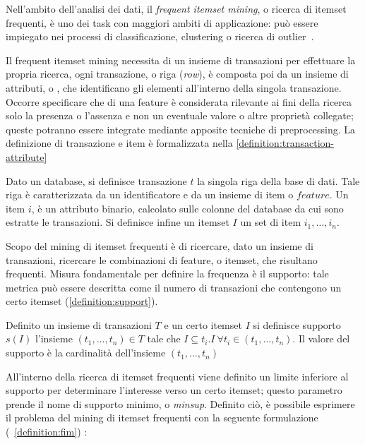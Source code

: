 Nell'ambito dell'analisi dei dati, il \textit{frequent itemset mining}, o ricerca di itemset frequenti,
è uno dei task con maggiori ambiti di applicazione: può essere impiegato nei processi di classificazione,
clustering o ricerca di outlier~\cite{article}.

Il frequent itemset mining necessita di un insieme di transazioni per effettuare la propria ricerca,
ogni transazione, o riga (\textit{row}), è composta poi da un insieme di attributi,
o , che identificano gli elementi all'interno della singola transazione.
Occorre specificare che di una feature è considerata rilevante ai fini della ricerca solo la presenza
o l'assenza e non un eventuale valore o altre proprietà collegate; queste potranno essere integrate
mediante apposite tecniche di preprocessing.
La definizione di transazione e item è formalizzata nella \cref{definition:transaction-attribute}

\begin{definition}\label{definition:transaction-attribute}
  Dato un database, si definisce transazione \(t\) la singola riga della base di dati.
  Tale riga è caratterizzata da un identificatore e da un insieme di item o \(feature\).
  Un item \(i\), è un attributo binario, calcolato sulle colonne del database da cui sono estratte le transazioni.
  Si definisce infine un itemset \(I\) un set di item \(i_1, \ldots, i_n\).
\end{definition}


Scopo del mining di itemset frequenti è di ricercare, dato un insieme di transazioni, ricercare
le combinazioni di feature, o itemset, che risultano frequenti.
Misura fondamentale per definire la frequenza è il supporto: tale metrica può essere
descritta come il numero di transazioni che contengono un certo itemset (\cref{definition:support}).

\begin{definition}[Supporto]\label{definition:support}
Definito un insieme di transazioni \(T\) e un certo itemset \(I\) si definisce supporto \(s(I)\) l'insieme \((t_1, \ldots, t_n) \in T\) 
tale che \(I \subseteq t_i.I~\forall t_i \in (t_1, \ldots, t_n)\).
Il valore del supporto è la cardinalità dell'insieme \((t_1, \ldots, t_n)\)
\end{definition}

All'interno della ricerca di itemset frequenti viene definito un limite inferiore al supporto
per determinare l'interesse verso un certo itemset; questo parametro prende il nome
di supporto minimo, o \textit{minsup}.
Definito ciò, è possibile esprimere il problema del mining di itemset frequenti con
la seguente formulazione (~\cref{definition:fim}) :

